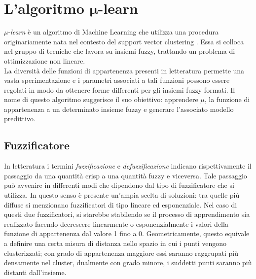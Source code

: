 \documentclass[12pt]{report}
\theoremstyle{definition}
\begin{document}
\section[\texorpdfstring{L'algoritmo $\mu$-learn}%
                        {mu-learn}]%
        {L'algoritmo $\bm{\mu}$-learn}  %
\label{mulearn}
$\mu$-\textit{learn} è un algoritmo di Machine Learning che utilizza una procedura originariamente nata nel contesto del support vector clustering \cite{23}.
Essa si colloca nel gruppo di tecniche che lavora su insiemi fuzzy, trattando un problema di ottimizzazione non lineare.
\\
La diversità delle funzioni di appartenenza presenti in letteratura permette una vasta sperimentazione e i parametri associati a tali funzioni possono essere regolati in modo da ottenere forme differenti per gli insiemi fuzzy formati.
Il nome di questo algoritmo suggerisce il suo obiettivo: apprendere $\mu$, la funzione di appartenenza a un determinato insieme fuzzy e generare l'associato modello predittivo.

\subsection{Fuzzificatore} \label{fuzzificatore}
In letteratura i termini \textit{fuzzificazione} e \textit{defuzzificazione} indicano rispettivamente il passaggio da una quantità crisp a una quantità fuzzy e viceversa.
Tale passaggio può avvenire in differenti modi che dipendono dal tipo di fuzzificatore che si utilizza. In questo senso è presente un'ampia scelta di soluzioni: tra quelle più diffuse si menzionano fuzzificatori di tipo lineare ed esponenziale. Nel caso di questi due fuzzificatori, si starebbe stabilendo se il processo di apprendimento sia realizzato facendo decrescere linearmente o esponenzialmente i valori della funzione di appartenenza dal valore 1 fino a 0. Geometricamente, questo equivale a definire una certa misura di distanza nello spazio in cui i punti vengono clusterizzati; con grado di appartenenza maggiore essi saranno raggrupati più densamente nel cluster, dualmente con grado minore, i suddetti punti saranno più distanti dall'insieme.
\end{document}
